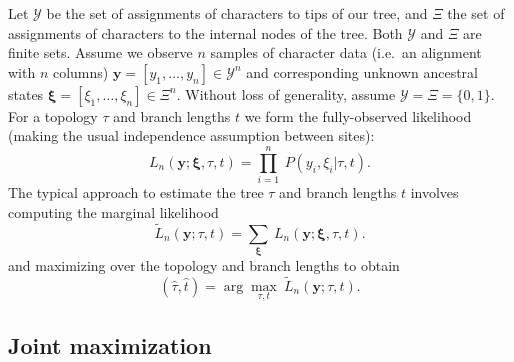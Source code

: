 \documentclass[a4paper]{article}
\begin{document}
Let $\mathcal{Y}$ be the set of assignments of characters to tips of our tree, and $\Xi$ the set of assignments of characters to the internal nodes of the tree.
Both $\mathcal{Y}$ and $\Xi$ are finite sets.
Assume we observe $n$ samples of character data (i.e.\ an alignment with $n$ columns) $\mathbf{y}=[y_1,\ldots,y_n]\in\mathcal{Y}^n$ and corresponding unknown ancestral states $\boldsymbol\xi=[\xi_1,\ldots,\xi_n]\in\Xi^n$.
Without loss of generality, assume $\mathcal{Y}=\Xi=\{0,1\}$.
For a topology $\tau$ and branch lengths $t$ we form the fully-observed likelihood (making the usual independence assumption between sites):
\begin{equation}
\label{eq:full_likelihood}
L_n(\mathbf{y};\boldsymbol\xi, \tau, t) = \prod_{i=1}^{n} \ P(y_i, \xi_i | \tau, t).
\end{equation}
The typical approach to estimate the tree $\tau$ and branch lengths $t$ involves computing the marginal likelihood
\begin{equation}
\label{eq:marginal_likelihood}
\tilde{L}_n(\mathbf{y}; \tau, t) = \sum_{\boldsymbol\xi} \ L_n(\mathbf{y};\boldsymbol\xi, \tau, t).
\end{equation}
and maximizing over the topology and branch lengths to obtain
$$
(\hat{\tau}, \hat{t}) = \arg\max_{\tau, t} \  \tilde{L}_n(\mathbf{y}; \tau, t).
$$

\subsection{Joint maximization}
\end{document}
